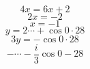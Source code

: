 \documentclass{article}
\begin{document}
$$
4x = 6x + 2
$$
$$
2x = - 2
$$
$$
x = - 1
$$
$$
y = 2\cdots + \cos 0 \cdot 28
$$
$$
3y = - \cos 0 \cdot 28
$$
$$
- \cdots - \frac{i}{3} \cos 0 - 28
$$
\end{document}

